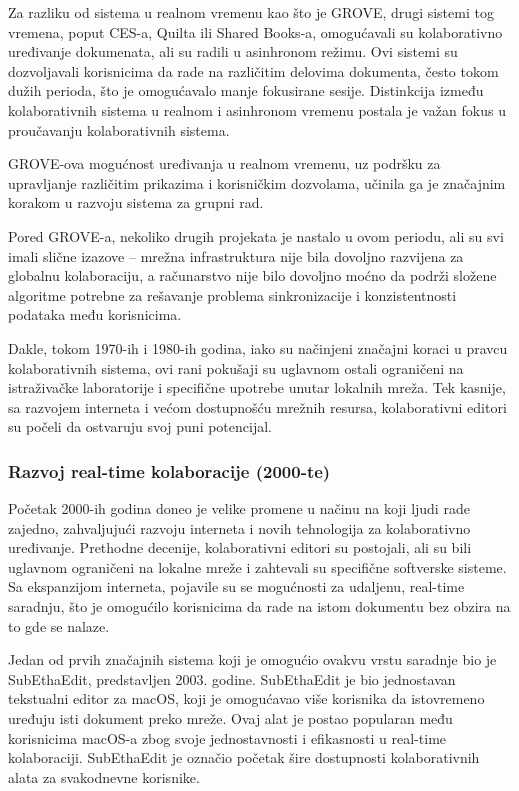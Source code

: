 \documentclass[12pt]{article}
\begin{document}
    Za razliku od sistema u realnom vremenu kao što je GROVE, drugi sistemi tog vremena, poput CES-a, Quilta ili Shared Books-a, omogućavali su kolaborativno uređivanje dokumenata, ali su radili u asinhronom režimu. Ovi sistemi su dozvoljavali korisnicima da rade na različitim delovima dokumenta, često tokom dužih perioda, što je omogućavalo manje fokusirane sesije. Distinkcija između kolaborativnih sistema u realnom i asinhronom vremenu postala je važan fokus u proučavanju kolaborativnih sistema.
    
    GROVE-ova mogućnost uređivanja u realnom vremenu, uz podršku za upravljanje različitim prikazima i korisničkim dozvolama, učinila ga je značajnim korakom u razvoju sistema za grupni rad.
    
    Pored GROVE-a, nekoliko drugih projekata je nastalo u ovom periodu, ali su svi imali slične izazove – mrežna infrastruktura nije bila dovoljno razvijena za globalnu kolaboraciju, a računarstvo nije bilo dovoljno moćno da podrži složene algoritme potrebne za rešavanje problema sinkronizacije i konzistentnosti podataka među korisnicima.
    
    Dakle, tokom 1970-ih i 1980-ih godina, iako su načinjeni značajni koraci u pravcu kolaborativnih sistema, ovi rani pokušaji su uglavnom ostali ograničeni na istraživačke laboratorije i specifične upotrebe unutar lokalnih mreža. Tek kasnije, sa razvojem interneta i većom dostupnošću mrežnih resursa, kolaborativni editori su počeli da ostvaruju svoj puni potencijal.

    \subsubsection{Razvoj real-time kolaboracije (2000-te)}

    Početak 2000-ih godina doneo je velike promene u načinu na koji ljudi rade zajedno, zahvaljujući razvoju interneta i novih tehnologija za kolaborativno uređivanje. Prethodne decenije, kolaborativni editori su postojali, ali su bili uglavnom ograničeni na lokalne mreže i zahtevali su specifične softverske sisteme. Sa ekspanzijom interneta, pojavile su se mogućnosti za udaljenu, real-time saradnju, što je omogućilo korisnicima da rade na istom dokumentu bez obzira na to gde se nalaze.

    Jedan od prvih značajnih sistema koji je omogućio ovakvu vrstu saradnje bio je SubEthaEdit, predstavljen 2003. godine. SubEthaEdit je bio jednostavan tekstualni editor za macOS, koji je omogućavao više korisnika da istovremeno uređuju isti dokument preko mreže. Ovaj alat je postao popularan među korisnicima macOS-a zbog svoje jednostavnosti i efikasnosti u real-time kolaboraciji. SubEthaEdit je označio početak šire dostupnosti kolaborativnih alata za svakodnevne korisnike.
    
\end{document}
